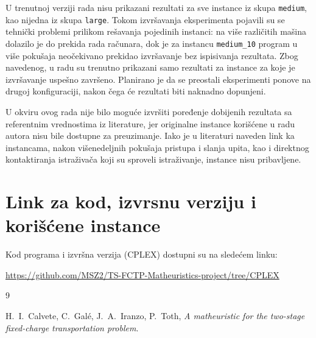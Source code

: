 \documentclass[12pt,a4paper]{article}
\begin{document}
\begin{tcolorbox}[myrednote,title=Napomena o rezultatima većih instanci]
U trenutnoj verziji rada nisu prikazani rezultati za sve instance iz skupa \texttt{medium}, kao nijedna iz skupa \texttt{large}. 
Tokom izvršavanja eksperimenta pojavili su se tehnički problemi prilikom rešavanja pojedinih instanci: na više različitih mašina dolazilo je do prekida rada računara, dok je za instancu \texttt{medium\_10} program u više pokušaja neočekivano prekidao izvršavanje bez ispisivanja rezultata. 
Zbog navedenog, u radu su trenutno prikazani samo rezultati za instance za koje je izvršavanje uspešno završeno. 
Planirano je da se preostali eksperimenti ponove na drugoj konfiguraciji, nakon čega će rezultati biti naknadno dopunjeni.
\end{tcolorbox}

\begin{tcolorbox}[myrednote,title=Napomena o rezultatima i pribavljanju referentnih instanci]
U okviru ovog rada nije bilo moguće izvršiti poređenje dobijenih rezultata sa referentnim vrednostima iz literature, jer originalne instance korišćene u radu autora nisu bile dostupne za preuzimanje. Iako je u literaturi naveden link ka instancama, nakon višenedeljnih pokušaja pristupa i slanja upita, kao i direktnog kontaktiranja istraživača koji su sproveli istraživanje, instance nisu pribavljene. 
\end{tcolorbox}


\section{Link za kod, izvrsnu verziju i korišćene instance}
Kod programa i izvršna verzija (CPLEX) dostupni su na sledećem linku:

\begin{center}
\url{https://github.com/MSZ2/TS-FCTP-Matheuristics-project/tree/CPLEX}
\end{center}

\begin{thebibliography}{9}

H.~I.~Calvete, C.~Gal\'e, J.~A.~Iranzo, P.~Toth,
\textit{A matheuristic for the two-stage fixed-charge transportation problem}.

\end{thebibliography}
\end{document}
